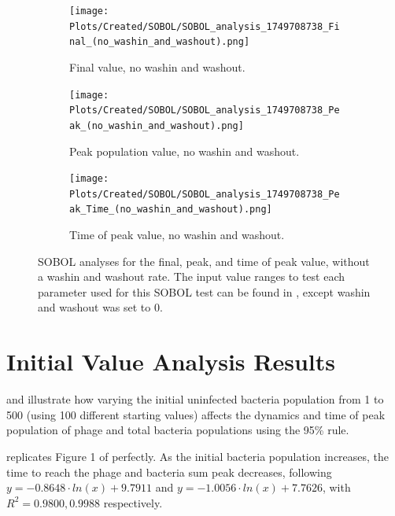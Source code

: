 \begin{figure}[ht!]
    \centering
    \begin{subfigure}{0.32\linewidth}
        \centering
        \captionsetup{width=1\linewidth}
        \texttt{[image: Plots/Created/SOBOL/SOBOL\_analysis\_1749708738\_Final\_(no\_washin\_and\_washout).png]}
        \caption{
            Final value, no washin and washout. 
        }
        \label{fig:created:SOBOL_final_no_wi_wo}
    \end{subfigure}
    \hfill
    \begin{subfigure}{0.32\linewidth}
        \centering
        \captionsetup{width=1\linewidth}
        \texttt{[image: Plots/Created/SOBOL/SOBOL\_analysis\_1749708738\_Peak\_(no\_washin\_and\_washout).png]}
        \caption{
            Peak population value, no washin and washout. 
        }
        \label{fig:created:SOBOL_peak_no_wi_wo}
    \end{subfigure}
    \hfill
    \begin{subfigure}{0.32\linewidth}
        \centering
        \captionsetup{width=1\linewidth}
        \texttt{[image: Plots/Created/SOBOL/SOBOL\_analysis\_1749708738\_Peak\_Time\_(no\_washin\_and\_washout).png]}
        \caption{
            Time of peak value, no washin and washout. 
        }
        \label{fig:created:SOBOL_peak_time_no_wi_wo}
    \end{subfigure}
    \caption{
        SOBOL analyses for the final, peak, and time of peak value, without a washin and washout rate.
        The input value ranges to test each parameter used for this SOBOL test can be found in , except washin and washout was set to 0. 
    }
    \label{fig:created:SOBOL_no_wi_wo}
\end{figure}

\section{Initial Value Analysis Results}
\label{sec:results:initial_value_analysis}

 and  illustrate how varying the initial uninfected bacteria population from 1 to 500 (using 100 different starting values) affects the dynamics and time of peak population of phage and total bacteria populations using the 95\% rule. 

 replicates  Figure 1 of \citet{mullaExtremeDiversityPhage2024} perfectly. 
As the initial bacteria population increases, the time to reach the phage and bacteria sum peak decreases, following $y = -0.8648\cdot ln(x) + 9.7911$ and $y = -1.0056\cdot ln(x)+7.7626$, with $R^2=0.9800, 0.9988$ respectively. 

